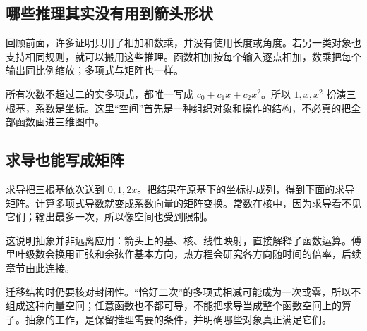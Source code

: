 \subsection*{哪些推理其实没有用到箭头形状}
回顾前面，许多证明只用了相加和数乘，并没有使用长度或角度。若另一类对象也支持相同规则，就可以搬用这些推理。函数相加按每个输入逐点相加，数乘把每个输出同比例缩放；多项式与矩阵也一样。

所有次数不超过二的实多项式，都唯一写成 $c_0+c_1x+c_2x^2$。所以 $1,x,x^2$ 扮演三根基，系数是坐标。这里“空间”首先是一种组织对象和操作的结构，不必真的把全部函数画进三维图中。

\subsection*{求导也能写成矩阵}
求导把三根基依次送到 $0,1,2x$。把结果在原基下的坐标排成列，得到下面的求导矩阵。计算多项式导数就变成系数向量的矩阵变换。常数在核中，因为求导看不见它们；输出最多一次，所以像空间也受到限制。

这说明抽象并非远离应用：箭头上的基、核、线性映射，直接解释了函数运算。傅里叶级数会换用正弦和余弦作基本方向，热方程会研究各方向随时间的倍率，后续章节由此连接。

迁移结构时仍要核对封闭性。“恰好二次”的多项式相减可能成为一次或零，所以不组成这种向量空间；任意函数也不都可导，不能把求导当成整个函数空间上的算子。抽象的工作，是保留推理需要的条件，并明确哪些对象真正满足它们。
